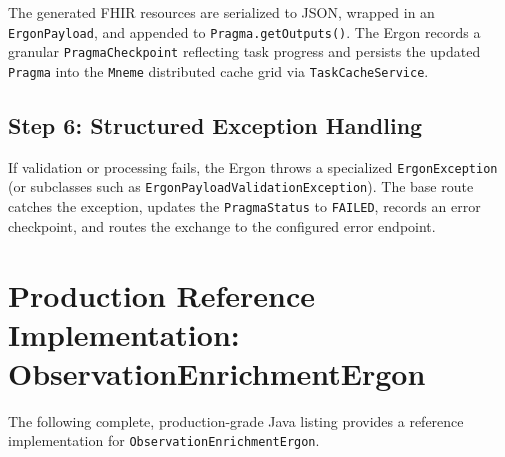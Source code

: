 The generated FHIR resources are serialized to JSON, wrapped in an \texttt{ErgonPayload}, and appended to \texttt{Pragma.getOutputs()}. The Ergon records a granular \texttt{PragmaCheckpoint} reflecting task progress and persists the updated \texttt{Pragma} into the \texttt{Mneme} distributed cache grid via \texttt{TaskCacheService}.

\subsection{Step 6: Structured Exception Handling}

If validation or processing fails, the Ergon throws a specialized \texttt{ErgonException} (or subclasses such as \texttt{ErgonPayloadValidationException}). The base route catches the exception, updates the \texttt{PragmaStatus} to \texttt{FAILED}, records an error checkpoint, and routes the exchange to the configured error endpoint.

\section{Production Reference Implementation: ObservationEnrichmentErgon}
\label{sec:ergon_reference_impl}

The following complete, production-grade Java listing provides a reference implementation for \texttt{ObservationEnrichmentErgon}.


